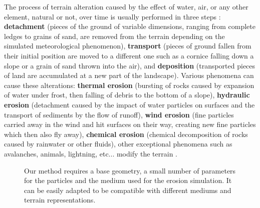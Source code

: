The process of terrain alteration caused by the effect of water, air, or any other element, natural or not, over time is usually performed in three steps \cite{Neidhold2005}: \textbf{detachment} (pieces of the ground of variable dimensions, ranging from complete ledges to grains of sand, are removed from the terrain depending on the simulated meteorological phenomenon), \textbf{transport} (pieces of ground fallen from their initial position are moved to a different one such as a cornice falling down a slope or a grain of sand thrown into the air), and \textbf{deposition} (transported pieces of land are accumulated at a new part of the landscape). Various phenomena can cause these alterations: \textbf{thermal erosion} (bursting of rocks caused by expansion of water under frost, then falling of debris to the bottom of a slope), \textbf{hydraulic erosion} (detachment caused by the impact of water particles on surfaces and the transport of sediments by the flow of runoff), \textbf{wind erosion} (fine particles carried away in the wind and hit surfaces on their way, creating new fine particles which then also fly away), \textbf{chemical erosion} (chemical decomposition of rocks caused by rainwater or other fluids), other exceptional phenomena such as avalanches, animals, lightning, etc... modify the terrain \cite{Cordonnier2017a, Argudo2020, Cordonnier2018, Cordonnier2017b,Cordonnier2023}.

\begin{figure}
    \caption{Our method requires a base geometry, a small number of parameters for the particles and the medium used for the erosion simulation. It can be easily adapted to be compatible with different mediums and terrain representations.}
    \label{fig:erosion-pipeline}
\end{figure}

